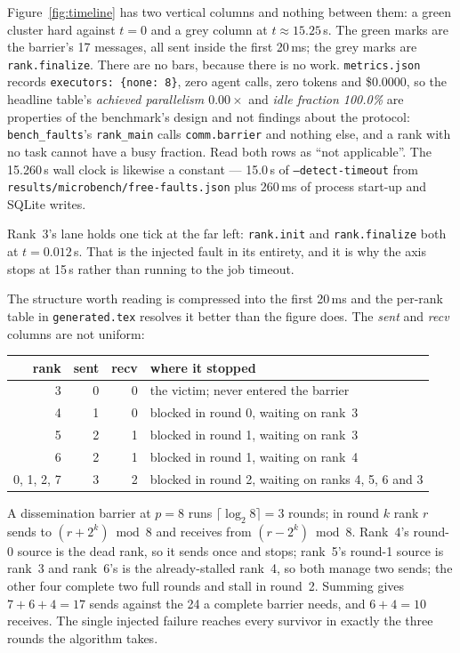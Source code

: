 \documentclass[11pt]{article}
\begin{document}
Figure~\ref{fig:timeline} has two vertical columns and nothing between them: a green
cluster hard against $t=0$ and a grey column at $t\approx15.25$\,s. The green marks are
the barrier's 17 messages, all sent inside the first 20\,ms; the grey marks are
\texttt{rank.finalize}. There are no bars, because there is no work.
\texttt{metrics.json} records \texttt{executors: \{none: 8\}}, zero agent calls, zero
tokens and \$0.0000, so the headline table's \emph{achieved parallelism $0.00\times$} and
\emph{idle fraction 100.0\%} are properties of the benchmark's design and not findings
about the protocol: \texttt{bench\_faults}'s \texttt{rank\_main} calls \texttt{comm.barrier}
and nothing else, and a rank with no task cannot have a busy fraction. Read both rows as
``not applicable''. The 15.260\,s wall clock is likewise a constant --- 15.0\,s of
\texttt{--detect-timeout} from \texttt{results/microbench/free-faults.json} plus 260\,ms of
process start-up and SQLite writes.

Rank~3's lane holds one tick at the far left: \texttt{rank.init} and
\texttt{rank.finalize} both at $t=0.012$\,s. That is the injected fault in its entirety,
and it is why the axis stops at 15\,s rather than running to the job timeout.

The structure worth reading is compressed into the first 20\,ms and the per-rank table in
\texttt{generated.tex} resolves it better than the figure does. The \emph{sent} and
\emph{recv} columns are not uniform:

\begin{center}\footnotesize
\begin{tabular}{@{}rrrl@{}}
\toprule
rank & sent & recv & where it stopped \\
\midrule
3 & 0 & 0 & the victim; never entered the barrier \\
4 & 1 & 0 & blocked in round 0, waiting on rank~3 \\
5 & 2 & 1 & blocked in round 1, waiting on rank~3 \\
6 & 2 & 1 & blocked in round 1, waiting on rank~4 \\
0, 1, 2, 7 & 3 & 2 & blocked in round 2, waiting on ranks 4, 5, 6 and 3 \\
\bottomrule
\end{tabular}\normalsize
\end{center}

A dissemination barrier at $p=8$ runs $\lceil \log_2 8 \rceil = 3$ rounds; in round $k$
rank $r$ sends to $(r + 2^k) \bmod 8$ and receives from $(r - 2^k) \bmod 8$. Rank~4's
round-0 source is the dead rank, so it sends once and stops; rank~5's round-1 source is
rank~3 and rank~6's is the already-stalled rank~4, so both manage two sends; the other
four complete two full rounds and stall in round~2. Summing gives $7+6+4 = 17$ sends
against the 24 a complete barrier needs, and $6+4=10$ receives. The single injected
failure reaches every survivor in exactly the three rounds the algorithm takes.
\end{document}

